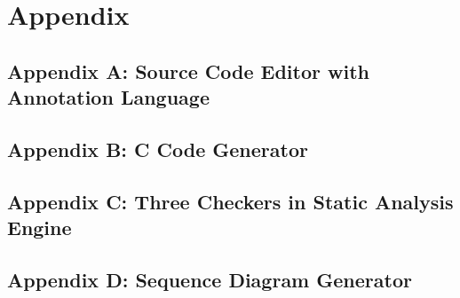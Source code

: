 \chapter{Appendix}
\section{Appendix A: Source Code Editor with Annotation Language}


\section{Appendix B: C Code Generator}	
	\label{C_Code_Generator_Xtend_Code_Snippet}
	
	
\section{Appendix C: Three Checkers in Static Analysis Engine}

\section{Appendix D: Sequence Diagram Generator}
